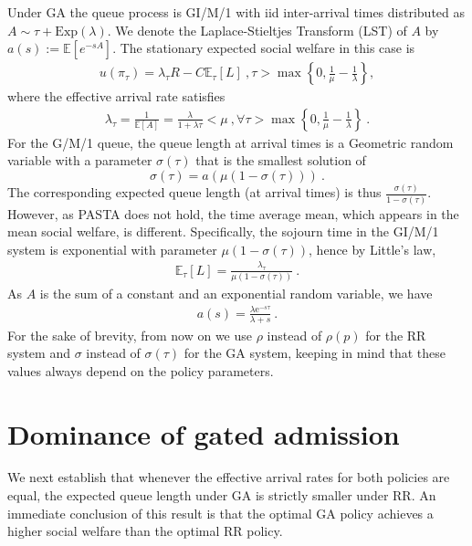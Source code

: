 \documentclass[11pt]{article}
\def\E{\mathbb{E}}
\def\e{\mathrm{e}}
\begin{document}
Under GA the queue process is GI/M/1 with iid inter-arrival times distributed as $A\sim\tau+\mathrm{Exp}(\lambda)$. We denote the Laplace-Stieltjes Transform (LST) of $A$ by $a(s):=\E[e^{-sA}]$. The stationary expected social welfare in this case is
\begin{align*}
    u(\pi_\tau)=\lambda_\tau R- C\E_\tau[L]\ , \tau >\max\left\lbrace 0,\frac{1}{\mu}-\frac{1}{\lambda}\right\rbrace , 
\end{align*}
where the effective arrival rate satisfies
\begin{align*}
    \lambda_\tau =\frac{1}{\E[A]}=\frac{\lambda}{1+\lambda\tau}<\mu \ , \forall \tau >\max\left\lbrace 0,\frac{1}{\mu}-\frac{1}{\lambda}\right\rbrace  \ .
\end{align*}
For the G/M/1 queue, the queue length at arrival times is a Geometric random variable with a parameter $\sigma(\tau)$ that is the smallest solution of
\begin{equation}\label{eq:GM1_fixed_point}
    \sigma(\tau)=a(\mu(1-\sigma(\tau)))\ .    
\end{equation}
The corresponding expected queue length (at arrival times) is thus $\frac{\sigma(\tau)}{1-\sigma(\tau)}$. However, as PASTA does not hold, the time average mean, which appears in the mean social welfare, is different. Specifically, the sojourn time in the GI/M/1 system is exponential with parameter $\mu(1-\sigma(\tau))$, hence by Little's law,
\begin{align*}
    \E_\tau[L]=\frac{\lambda_\tau}{\mu(1-\sigma(\tau))}\ .
\end{align*}
As $A$ is the sum of a constant and an exponential random variable, we have
\begin{align*}
    a(s)=\frac{\lambda \e^{-s\tau}}{\lambda+s} \ .
\end{align*}
For the sake of brevity, from now on we use $\rho$ instead of $\rho(p)$ for the RR system and $\sigma$ instead of $\sigma(\tau)$ for the GA system, keeping in mind that these values always depend on the policy parameters.

\section{Dominance of gated admission}\label{sec:dominant_GA}

We next establish that whenever the effective arrival rates for both policies are equal, the expected queue length under GA is strictly smaller under RR. An immediate conclusion of this result is that the optimal GA policy achieves a higher social welfare than the optimal RR policy.
\end{document}
